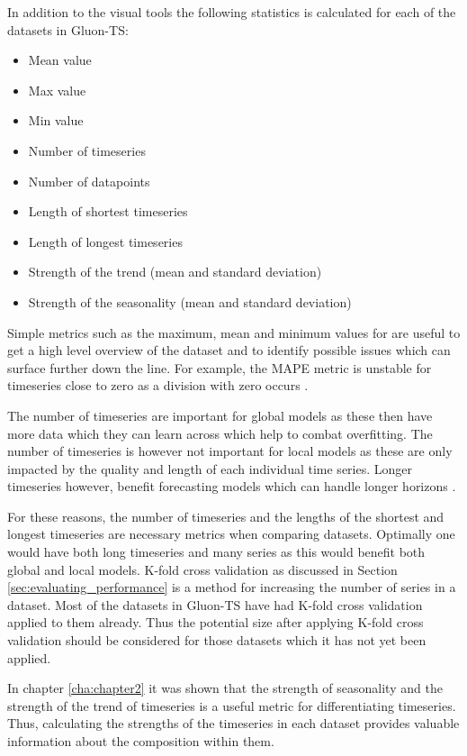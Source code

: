 In addition to the visual tools the following statistics is calculated for each of the datasets in Gluon-TS:

\begin{itemize}
  \item Mean value
  \item Max value
  \item Min value
  \item Number of timeseries
  \item Number of datapoints
  \item Length of shortest timeseries
  \item Length of longest timeseries
  \item Strength of the trend (mean and standard deviation)
  \item Strength of the seasonality (mean and standard deviation)
\end{itemize}

Simple metrics such as the maximum, mean and minimum values for are useful to get a high level overview of the dataset and to identify possible issues which can surface further down the line. For example, the MAPE metric is unstable for timeseries close to zero as a division with zero occurs \cite{hyndman_forecasting_3rd}.

The number of timeseries are important for global models as these then have more data which they can learn across which help to combat overfitting. The number of timeseries is however not important for local models as these are only impacted by the quality and length of each individual time series. Longer timeseries however, benefit forecasting models which can handle longer horizons \cite{makridakis_m4_2020}.

For these reasons, the number of timeseries and the lengths of the shortest and longest timeseries are necessary metrics when comparing datasets. Optimally one would have both long timeseries and many series as this would benefit both global and local models. K-fold cross validation as discussed in Section \ref{sec:evaluating_performance} is a method for increasing the number of series in a dataset. Most of the datasets in Gluon-TS have had K-fold cross validation applied to them already. Thus the potential size after applying K-fold cross validation should be considered for those datasets which it has not yet been applied.

In chapter \ref{cha:chapter2} it was shown that the strength of seasonality and the strength of the trend of timeseries is a useful metric for differentiating timeseries. Thus, calculating the strengths of the timeseries in each dataset provides valuable information about the composition within them.

